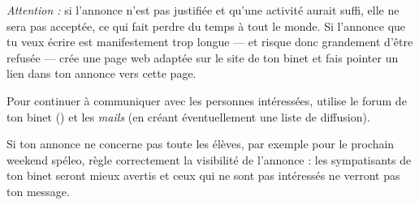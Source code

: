 \emph{Attention :} si l'annonce n'est pas justifiée et qu'une activité aurait suffi, elle ne sera pas acceptée, ce qui fait perdre du temps à tout le
monde. Si l'annonce que tu veux écrire est manifestement trop longue --- et risque donc grandement d'être refusée --- crée une page web adaptée sur le
site de ton binet et fais pointer un lien dans ton annonce vers cette page.

Pour continuer à communiquer avec les personnes intéressées, utilise
le forum de ton binet () et les \emph{mails}
(en créant éventuellement une liste de diffusion).

Si ton annonce ne concerne pas toute les élèves, par
exemple pour le prochain weekend spéleo, règle correctement la
visibilité de l'annonce : les sympatisants de ton binet seront mieux
avertis et ceux qui ne sont pas intéressés ne verront pas ton message.
